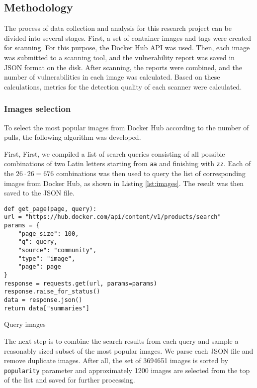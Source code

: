 \subsection{Methodology}

The process of data collection and analysis for this research project can be divided into several stages. First, a set of container images and tags were created for scanning. For this purpose, the Docker Hub API was used. Then, each image was submitted to a scanning tool, and the vulnerability report was saved in JSON format on the disk. After scanning, the reports were combined, and the number of vulnerabilities in each image was calculated. Based on these calculations, metrics for the detection quality of each scanner were calculated.

\subsubsection{Images selection}

To select the most popular images from Docker Hub according to the number of pulls, the following algorithm was developed.

First, First, we compiled a list of search queries consisting of all possible combinations of two Latin letters starting from \texttt{aa} and finishing with \texttt{zz}. Each of the $26 \cdot 26 = 676$ combinations was then used to query the list of corresponding images from Docker Hub, as shown in Listing \ref{lst:images}. The result was then saved to the JSON file.
\begin{listing}[htp]
    \centering
    \begin{minipage}{0.8\linewidth}
        \begin{verbatim}
def get_page(page, query):
url = "https://hub.docker.com/api/content/v1/products/search"
params = {
    "page_size": 100,
    "q": query,
    "source": "community",
    "type": "image",
    "page": page
}
response = requests.get(url, params=params)
response.raise_for_status()
data = response.json()
return data["summaries"]
        \end{verbatim}
    \end{minipage}
    \caption{Query images}
    \label{lst:images}
\end{listing}

The next step is to combine the search results from each query and sample a reasonably sized subset of the most popular images. We parse each JSON file and remove duplicate images. After all, the set of 3694651 images is sorted by \texttt{popularity} parameter and approximately 1200 images are selected from the top of the list and saved for further processing.

